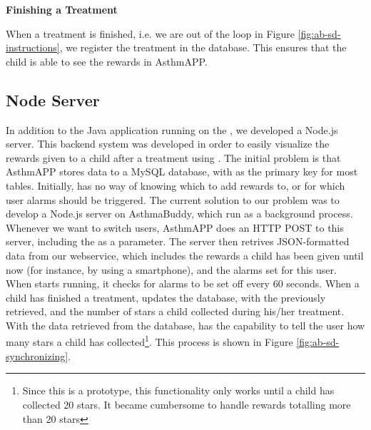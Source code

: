 \textbf{Finishing a Treatment}

When a treatment is finished, i.e. we are out of the  loop in Figure \ref{fig:ab-sd-instructions}, we register the treatment in the database. This ensures that the child is able to see the rewards in AsthmAPP. 


\subsection{Node Server}
\label{sec:node-server}
In addition to the Java application running on the \rpi{}, we developed a Node.js server. This backend system was developed in order to easily visualize the rewards given to a child after a treatment using \buddy{}. The initial problem is that AsthmAPP stores data to a MySQL database, with  as the primary key for most tables. Initially, \buddy{} has no way of knowing which  to add rewards to, or for which user alarms should be triggered. The current solution to our problem was to develop a Node.js server on AsthmaBuddy, which run as a background process. Whenever we want to switch users, AsthmAPP does an HTTP POST to this server, including the  as a parameter. The server then retrives JSON-formatted data from our webservice, which includes the rewards a child has been given until now (for instance, by using a smartphone), and the alarms set for this user. 
When \buddy{} starts running, it checks for alarms to be set off every 60 seconds. When a child has finished a treatment,  updates the database, with the  previously retrieved, and the number of stars a child collected during his/her treatment. With the data retrieved from the database, \buddy{} has the capability to tell the user how many stars a child has collected\footnote{Since this is a prototype, this functionality only works until a child has collected 20 stars. It became cumbersome to handle rewards totalling more than 20 stars}. This process is shown in Figure \ref{fig:ab-sd-synchronizing}.

